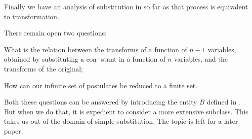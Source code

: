 \documentclass[10pt, twoside]{extarticle}
\theoremstyle{breaktheorem}
\theoremstyle{mylemma}
\theoremstyle{mydefinition}
\theoremstyle{mycorollary}
\begin{document}
Finally we have an analysis of substitution in so far as that process is
equivalent to transformation.

There remain open two questions: \begin{enumerate*}[label=\arabic*)] \item What is the relation between the
  transforms of a function of \(n - 1\) variables, obtained by substituting a con-
  stant in a function of \(n\) variables, and the transforms of the original;
  \item How can our infinite set of postulates be reduced to a finite set. \end{enumerate*} Both
these questions can be answered by introducing the entity \(B\) defined in .
But when we do that, it is expedient to consider a more extensive subclass.
This takes us out of the domain of simple substitution. The topic is left for
a later paper.
\end{document}
